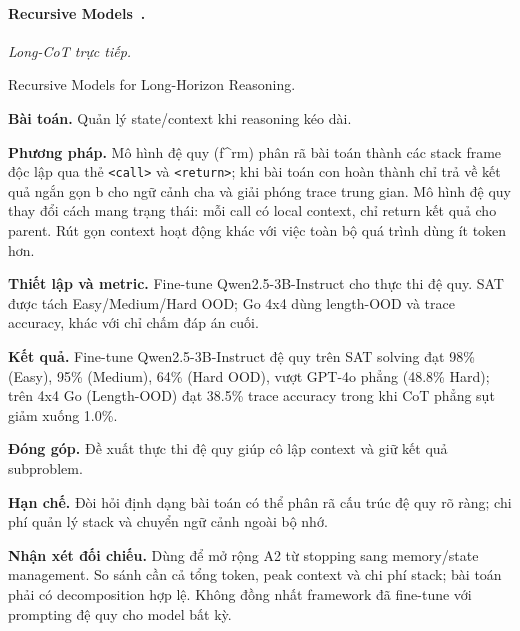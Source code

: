 \begin{samepage}
\paragraph{Recursive Models~\cite{rra2_recursive_models}.}
\emph{Long-CoT trực tiếp.}\par
{\raggedright\noindent\small Recursive Models for Long-Horizon Reasoning.\par}
\noindent\textbf{Bài toán.} Quản lý state/context khi reasoning kéo dài.\par
\end{samepage}
\noindent\textbf{Phương pháp.} Mô hình đệ quy (f\textasciicircum{}rm) phân rã bài toán thành các stack frame độc lập qua thẻ \texttt{<call>} và \texttt{<return>}; khi bài toán con hoàn thành chỉ trả về kết quả ngắn gọn b cho ngữ cảnh cha và giải phóng trace trung gian. Mô hình đệ quy thay đổi cách mang trạng thái: mỗi call có local context, chỉ return kết quả cho parent. Rút gọn context hoạt động khác với việc toàn bộ quá trình dùng ít token hơn.\par
\noindent\textbf{Thiết lập và metric.} Fine-tune Qwen2.5-3B-Instruct cho thực thi đệ quy. SAT được tách Easy/Medium/Hard OOD; Go 4x4 dùng length-OOD và trace accuracy, khác với chỉ chấm đáp án cuối.\par
\noindent\textbf{Kết quả.} Fine-tune Qwen2.5-3B-Instruct đệ quy trên SAT solving đạt 98\% (Easy), 95\% (Medium), 64\% (Hard OOD), vượt GPT-4o phẳng (48.8\% Hard); trên 4x4 Go (Length-OOD) đạt 38.5\% trace accuracy trong khi CoT phẳng sụt giảm xuống 1.0\%.\par
\noindent\textbf{Đóng góp.} Đề xuất thực thi đệ quy giúp cô lập context và giữ kết quả subproblem.\par
\noindent\textbf{Hạn chế.} Đòi hỏi định dạng bài toán có thể phân rã cấu trúc đệ quy rõ ràng; chi phí quản lý stack và chuyển ngữ cảnh ngoài bộ nhớ.\par
\begin{samepage}
\noindent\textbf{Nhận xét đối chiếu.} Dùng để mở rộng A2 từ stopping sang memory/state management. So sánh cần cả tổng token, peak context và chi phí stack; bài toán phải có decomposition hợp lệ. Không đồng nhất framework đã fine-tune với prompting đệ quy cho model bất kỳ.\par
{}
\end{samepage}

